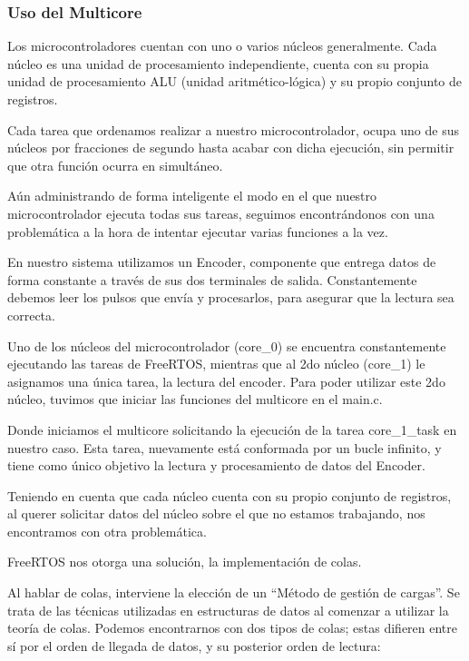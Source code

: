                 \subsubsection{Uso del Multicore}
                    Los microcontroladores cuentan con uno o varios núcleos generalmente. Cada núcleo es una unidad de procesamiento independiente, cuenta con su propia unidad de procesamiento ALU (unidad aritmético-lógica) y su propio conjunto de registros.\par
                    Cada tarea que ordenamos realizar a nuestro microcontrolador, ocupa uno de sus núcleos por fracciones de segundo hasta acabar con dicha ejecución, sin permitir que otra función ocurra en simultáneo.\par
                    Aún administrando de forma inteligente el modo en el que nuestro microcontrolador ejecuta todas sus tareas, seguimos encontrándonos con una problemática a la hora de intentar ejecutar varias funciones a la vez.\par
                    En nuestro sistema utilizamos un Encoder, componente que entrega datos de forma constante a través de sus dos terminales de salida. Constantemente debemos leer los pulsos que envía y procesarlos, para asegurar que la lectura sea correcta.\par 
	                Uno de los núcleos del microcontrolador (core\_0) se encuentra constantemente ejecutando las tareas de FreeRTOS, mientras que al 2do núcleo (core\_1) le asignamos una única tarea, la lectura del encoder.
                    Para poder utilizar este 2do núcleo, tuvimos que iniciar las funciones del multicore en el main.c.\par
                    \par
	                Donde iniciamos el multicore solicitando la ejecución de la tarea core\_1\_task en nuestro caso. Esta tarea, nuevamente está conformada por un bucle infinito, y tiene como único objetivo la lectura y procesamiento de datos del Encoder.\par
	                Teniendo en cuenta que cada núcleo cuenta con su propio conjunto de registros, al querer solicitar datos del núcleo sobre el que no estamos trabajando, nos encontramos con otra problemática.\par
	                FreeRTOS nos otorga una solución, la implementación de colas.\par
                    Al hablar de colas, interviene la elección de un “Método de gestión de cargas”. Se trata de las técnicas utilizadas en estructuras de datos al comenzar a utilizar la teoría de colas. Podemos encontrarnos con dos tipos de colas; estas difieren entre sí por el orden de llegada de datos, y su posterior orden de lectura:\par

